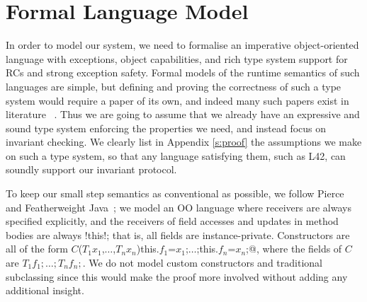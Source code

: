\section{Formal Language Model}
\label{s:formalism}
In order to model our system, we need to formalise an imperative object-oriented language
with exceptions, object capabilities, and rich type system
support for RCs and strong exception safety.
Formal models of the runtime semantics of such languages are simple, but 
defining and proving the correctness of such a type system would require a paper
of its own, and indeed many such papers exist in literature%
~\cite{ServettoEtAl13a,ServettoZucca15,GordonEtAl12,clebsch2015deny,JOT:issue_2011_01/article1}.
Thus we are going to assume that we already have an expressive and sound type system enforcing the properties we need, and instead focus on invariant checking.
We clearly list in Appendix \ref{s:proof} the assumptions we make on such a type system, so that any language satisfying them, such as L42, can soundly support our invariant protocol.

To keep our small step semantics as conventional as possible, we follow Pierce~\cite{pierce2002types} and Featherweight Java~\cite{IgarashiEtAl01};
we model an OO language where receivers are always specified explicitly,
 and the receivers of field accesses and updates in method bodies are always \Q!this!; that is, all fields are instance-private.
Constructors are all of the form \Q@$C$($T_1 x_1$,$\ldots$,$T_n x_n$){this.$f_1$=$x_1$;$\ldots$;this.$f_n$=$x_n$;}@, where the fields of $C$ are $T_1 f_1;\ldots; T_n f_n;$.
We do not model custom constructors and traditional subclassing since this would make the proof more involved without adding any additional insight.

